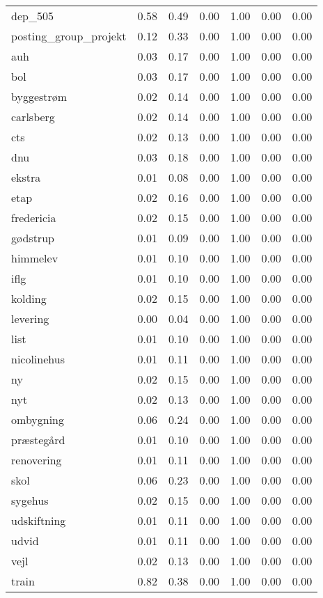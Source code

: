 \begin{landscape}
\begin{longtable}{lllllll}
dep\_505 & 0.58 & 0.49 & 0.00 & 1.00 & 0.00 & 0.00 \\
posting\_group\_projekt & 0.12 & 0.33 & 0.00 & 1.00 & 0.00 & 0.00 \\
auh & 0.03 & 0.17 & 0.00 & 1.00 & 0.00 & 0.00 \\
bol & 0.03 & 0.17 & 0.00 & 1.00 & 0.00 & 0.00 \\
byggestrøm & 0.02 & 0.14 & 0.00 & 1.00 & 0.00 & 0.00 \\
carlsberg & 0.02 & 0.14 & 0.00 & 1.00 & 0.00 & 0.00 \\
cts & 0.02 & 0.13 & 0.00 & 1.00 & 0.00 & 0.00 \\
dnu & 0.03 & 0.18 & 0.00 & 1.00 & 0.00 & 0.00 \\
ekstra & 0.01 & 0.08 & 0.00 & 1.00 & 0.00 & 0.00 \\
etap & 0.02 & 0.16 & 0.00 & 1.00 & 0.00 & 0.00 \\
fredericia & 0.02 & 0.15 & 0.00 & 1.00 & 0.00 & 0.00 \\
gødstrup & 0.01 & 0.09 & 0.00 & 1.00 & 0.00 & 0.00 \\
himmelev & 0.01 & 0.10 & 0.00 & 1.00 & 0.00 & 0.00 \\
iflg & 0.01 & 0.10 & 0.00 & 1.00 & 0.00 & 0.00 \\
kolding & 0.02 & 0.15 & 0.00 & 1.00 & 0.00 & 0.00 \\
levering & 0.00 & 0.04 & 0.00 & 1.00 & 0.00 & 0.00 \\
list & 0.01 & 0.10 & 0.00 & 1.00 & 0.00 & 0.00 \\
nicolinehus & 0.01 & 0.11 & 0.00 & 1.00 & 0.00 & 0.00 \\
ny & 0.02 & 0.15 & 0.00 & 1.00 & 0.00 & 0.00 \\
nyt & 0.02 & 0.13 & 0.00 & 1.00 & 0.00 & 0.00 \\
ombygning & 0.06 & 0.24 & 0.00 & 1.00 & 0.00 & 0.00 \\
præstegård & 0.01 & 0.10 & 0.00 & 1.00 & 0.00 & 0.00 \\
renovering & 0.01 & 0.11 & 0.00 & 1.00 & 0.00 & 0.00 \\
skol & 0.06 & 0.23 & 0.00 & 1.00 & 0.00 & 0.00 \\
sygehus & 0.02 & 0.15 & 0.00 & 1.00 & 0.00 & 0.00 \\
udskiftning & 0.01 & 0.11 & 0.00 & 1.00 & 0.00 & 0.00 \\
udvid & 0.01 & 0.11 & 0.00 & 1.00 & 0.00 & 0.00 \\
vejl & 0.02 & 0.13 & 0.00 & 1.00 & 0.00 & 0.00 \\
train & 0.82 & 0.38 & 0.00 & 1.00 & 0.00 & 0.00 \\
\end{longtable}\end{landscape}
